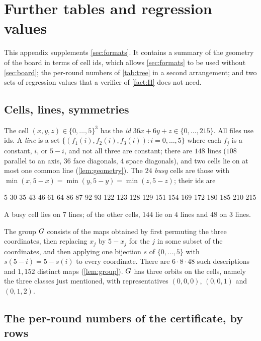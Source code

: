 \section{Further tables and regression values}\label{sec:supp-tables}

This appendix supplements \cref{sec:formats}. It contains a summary of the geometry of the board in terms
of cell ids, which allows \cref{sec:formats} to be used without \cref{sec:board}; the per-round numbers
of \cref{tab:tree} in a second arrangement; and two sets of regression values that a verifier of
\cref{fact:H} does not need.

\subsection{Cells, lines, symmetries}\label{ssec:fmt-cells}

The cell $(x,y,z)\in\{0,\dots,5\}^3$ has the \emph{id} $36x+6y+z\in\{0,\dots,215\}$. All files use ids. A
\emph{line} is a set $\{(f_1(i),f_2(i),f_3(i)): i=0,\dots,5\}$ where each $f_j$ is a constant, $i$, or
$5-i$, and not all three are constant; there are $148$ lines ($108$ parallel to an axis, $36$ face diagonals,
$4$ space diagonals), and two cells lie on at most one common line (\cref{lem:geometry}). The $24$
\emph{busy} cells are those with $\min(x,5-x)=\min(y,5-y)=\min(z,5-z)$; their ids are
\begin{center}\small{} 5 30 35 43 46 61 64 86 87 92 93 122 123 128 129 151 154 169 172 180 185 210 215
\end{center}
A busy cell lies on $7$ lines; of the other cells, $144$ lie on $4$ lines and $48$ on $3$ lines.

The group $G$ consists of the maps obtained by first permuting the three coordinates, then replacing
$x_j$ by $5-x_j$ for the $j$ in some subset of the coordinates, and then applying one bijection $s$ of
$\{0,\dots,5\}$ with $s(5-i)=5-s(i)$ to every coordinate. There are $6\cdot 8\cdot 48$ such descriptions and
$1{,}152$ distinct maps (\cref{lem:group}). $G$ has three orbits on the cells, namely the three classes just
mentioned, with representatives $(0,0,0)$, $(0,0,1)$ and $(0,1,2)$.

\subsection{The per-round numbers of the certificate, by rows}\label{ssec:supp-targets}

